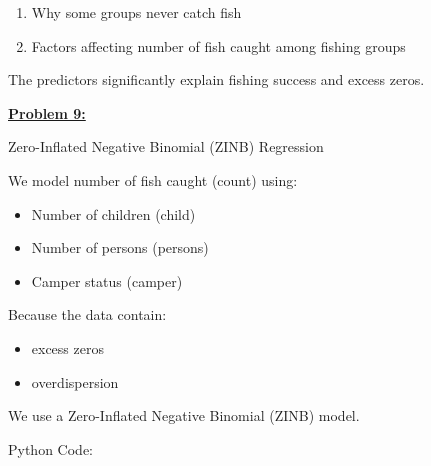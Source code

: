 \documentclass[
]{article}
\begin{document}
\begin{enumerate}
\def\labelenumi{\Roman{enumi}.}
\item
  Why some groups never catch fish
\item
  Factors affecting number of fish caught among fishing groups
\end{enumerate}

The predictors significantly explain fishing success and excess zeros.

\textbf{\ul{Problem 9:}}

Zero-Inflated Negative Binomial (ZINB) Regression

We model number of fish caught (count) using:

\begin{itemize}
\item
  Number of children (child)
\item
  Number of persons (persons)
\item
  Camper status (camper)
\end{itemize}

Because the data contain:

\begin{itemize}
\item
  excess zeros
\item
  overdispersion
\end{itemize}

We use a Zero-Inflated Negative Binomial (ZINB) model.

Python Code:
\end{document}
